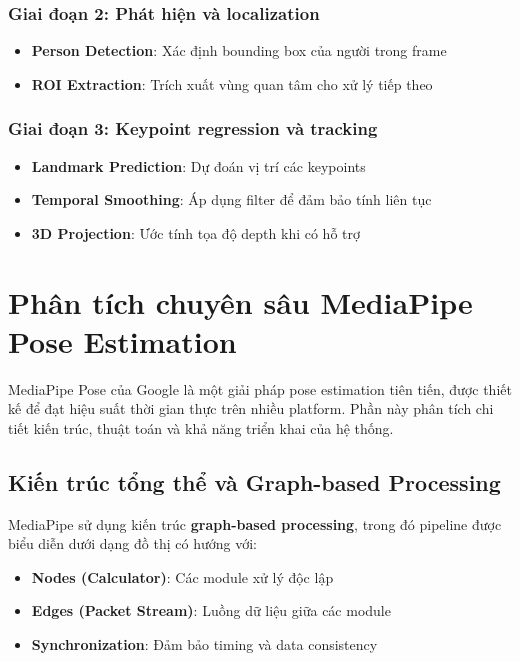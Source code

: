 \subsubsection{Giai đoạn 2: Phát hiện và localization}
\begin{itemize}
    \item \textbf{Person Detection}: Xác định bounding box của người trong frame
    \item \textbf{ROI Extraction}: Trích xuất vùng quan tâm cho xử lý tiếp theo
\end{itemize}

\subsubsection{Giai đoạn 3: Keypoint regression và tracking}
\begin{itemize}
    \item \textbf{Landmark Prediction}: Dự đoán vị trí các keypoints
    \item \textbf{Temporal Smoothing}: Áp dụng filter để đảm bảo tính liên tục
    \item \textbf{3D Projection}: Ước tính tọa độ depth khi có hỗ trợ
\end{itemize}

\section{Phân tích chuyên sâu MediaPipe Pose Estimation}

MediaPipe Pose của Google là một giải pháp pose estimation tiên tiến, được thiết kế để đạt hiệu suất thời gian thực trên nhiều platform. Phần này phân tích chi tiết kiến trúc, thuật toán và khả năng triển khai của hệ thống.

\subsection{Kiến trúc tổng thể và Graph-based Processing}

MediaPipe sử dụng kiến trúc \textbf{graph-based processing}, trong đó pipeline được biểu diễn dưới dạng đồ thị có hướng với:
\begin{itemize}
    \item \textbf{Nodes (Calculator)}: Các module xử lý độc lập
    \item \textbf{Edges (Packet Stream)}: Luồng dữ liệu giữa các module
    \item \textbf{Synchronization}: Đảm bảo timing và data consistency
\end{itemize}

